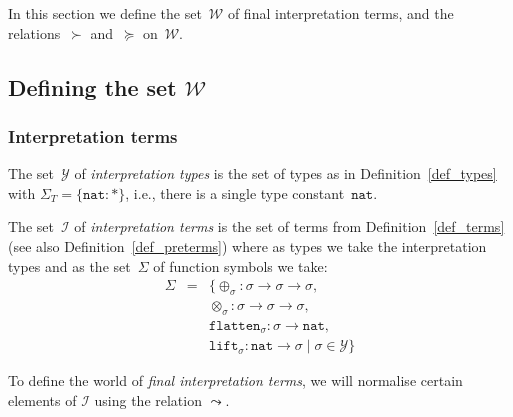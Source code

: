 \documentclass[runningheads,a4paper]{llncs}
\newcommand{\Iterms}{\mathcal{I}}
\newcommand{\World}{\mathcal{W}}
\newcommand{\ITypes}{\mathcal{Y}}
\newcommand{\arrtype}{\rightarrow}
\newcommand{\nat}{\mathtt{nat}}
\newcommand{\flatten}{\mathtt{flatten}}
\newcommand{\lift}{\mathtt{lift}}
\begin{document}
In this section we define the set~$\World$ of final interpretation
terms, and the relations~$\succ$ and~$\succeq$ on~$\World$.

\subsection{Defining the set $\World$}\label{sec_world}

\subsubsection{Interpretation terms}

\begin{definition}\label{def_iterms}\normalfont
  The set~$\ITypes$ of \emph{interpretation types} is the set of types
  as in Definition~\ref{def_types} with $\Sigma_T = \{ \nat : * \}$,
  i.e., there is a single type constant~$\nat$.

  The set~$\Iterms$ of \emph{interpretation terms} is the set of terms
  from Definition~\ref{def_terms} (see also
  Definition~\ref{def_preterms}) where as types we take the
  interpretation types and as the set~$\Sigma$ of function symbols we
  take:
  \[
    \begin{array}{rcl}
      \Sigma &=& \{ \oplus_\sigma : \sigma \arrtype
                 \sigma \arrtype \sigma,\\ & & \otimes_\sigma : \sigma \arrtype \sigma
                 \arrtype \sigma,\\ & & \flatten_{\sigma} : \sigma \arrtype
                 \nat,\\ & & \lift_{\sigma} : \nat \arrtype \sigma \mid \sigma \in \ITypes
                 \}
    \end{array}
  \]
\end{definition}

To define the world of \emph{final interpretation terms}, we will
normalise certain elements of $\Iterms$ using the relation $\leadsto$.
\end{document}
